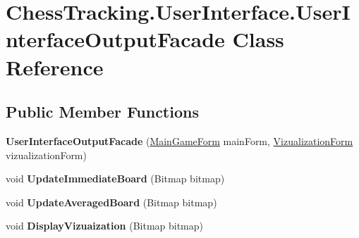 \hypertarget{class_chess_tracking_1_1_user_interface_1_1_user_interface_output_facade}{}\section{Chess\+Tracking.\+User\+Interface.\+User\+Interface\+Output\+Facade Class Reference}
\label{class_chess_tracking_1_1_user_interface_1_1_user_interface_output_facade}
\subsection*{Public Member Functions}
\begin{DoxyCompactItemize}
\item 
\mbox{\label{class_chess_tracking_1_1_user_interface_1_1_user_interface_output_facade_a35c869fa62f870a01f04c147b1c1fed5}} 
{\bfseries User\+Interface\+Output\+Facade} (\mbox{\hyperlink{class_chess_tracking_1_1_user_interface_1_1_main_game_form}{Main\+Game\+Form}} main\+Form, \mbox{\hyperlink{class_chess_tracking_1_1_user_interface_1_1_vizualization_form}{Vizualization\+Form}} vizualization\+Form)
\item 
\mbox{\label{class_chess_tracking_1_1_user_interface_1_1_user_interface_output_facade_a845f6415e7583a8592ebda29e11681b7}} 
void {\bfseries Update\+Immediate\+Board} (Bitmap bitmap)
\item 
\mbox{\label{class_chess_tracking_1_1_user_interface_1_1_user_interface_output_facade_a8ef0b49e0731584b425b46d92ed0ea9b}} 
void {\bfseries Update\+Averaged\+Board} (Bitmap bitmap)
\item 
\mbox{\label{class_chess_tracking_1_1_user_interface_1_1_user_interface_output_facade_a7d8c4131136cd5214f3144685f79bdbc}} 
void {\bfseries Display\+Vizuaization} (Bitmap bitmap)
\item 
\mbox{\label{class_chess_tracking_1_1_user_interface_1_1_user_interface_output_facade_add2148940eafe76a6e169fc7bdc38abd}} 

\end{DoxyCompactItemize}
